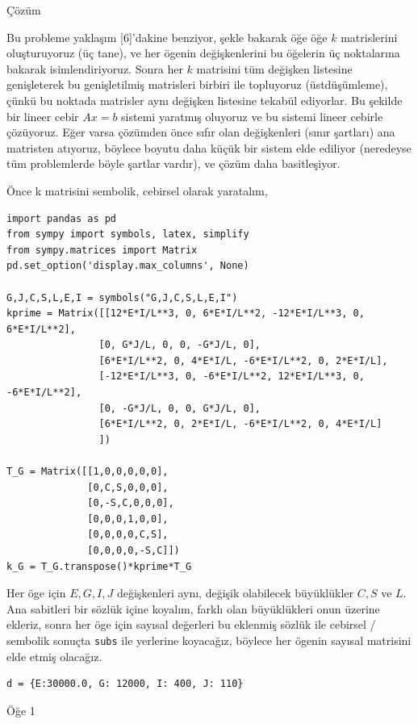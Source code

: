 \documentclass[12pt,fleqn]{article}\usepackage{../../common}
\begin{document}
Çözüm

Bu probleme yaklaşım [6]'dakine benziyor, şekle bakarak öğe öğe $k$ matrislerini
oluşturuyoruz (üç tane), ve her ögenin değişkenlerini bu öğelerin üç noktalarına
bakarak isimlendiriyoruz. Sonra her $k$ matrisini tüm değişken listesine
genişleterek bu genişletilmiş matrisleri birbiri ile topluyoruz (üstdüşümleme),
çünkü bu noktada matrisler aynı değişken listesine tekabül ediyorlar. Bu şekilde
bir lineer cebir $Ax = b$ sistemi yaratmış oluyoruz ve bu sistemi lineer cebirle
çözüyoruz. Eğer varsa çözümden önce sıfır olan değişkenleri (sınır şartları) ana
matristen atıyoruz, böylece boyutu daha küçük bir sistem elde ediliyor
(neredeyse tüm problemlerde böyle şartlar vardır), ve çözüm daha basitleşiyor.

Önce k matrisini sembolik, cebirsel olarak yaratalım,

\begin{verbatim}
import pandas as pd
from sympy import symbols, latex, simplify
from sympy.matrices import Matrix
pd.set_option('display.max_columns', None)

G,J,C,S,L,E,I = symbols("G,J,C,S,L,E,I")
kprime = Matrix([[12*E*I/L**3, 0, 6*E*I/L**2, -12*E*I/L**3, 0, 6*E*I/L**2],
                [0, G*J/L, 0, 0, -G*J/L, 0],
                [6*E*I/L**2, 0, 4*E*I/L, -6*E*I/L**2, 0, 2*E*I/L],
                [-12*E*I/L**3, 0, -6*E*I/L**2, 12*E*I/L**3, 0, -6*E*I/L**2],
                [0, -G*J/L, 0, 0, G*J/L, 0],
                [6*E*I/L**2, 0, 2*E*I/L, -6*E*I/L**2, 0, 4*E*I/L]
                ])

T_G = Matrix([[1,0,0,0,0,0],
              [0,C,S,0,0,0],
              [0,-S,C,0,0,0],
              [0,0,0,1,0,0],
              [0,0,0,0,C,S],
              [0,0,0,0,-S,C]])
k_G = T_G.transpose()*kprime*T_G
\end{verbatim}

Her öge için $E,G,I,J$ değişkenleri aynı, değişik olabilecek büyüklükler $C,S$
ve $L$. Ana sabitleri bir sözlük içine koyalım, farklı olan büyüklükleri onun
üzerine ekleriz, sonra her öge için sayısal değerleri bu eklenmiş sözlük ile
cebirsel / sembolik sonuçta \verb!subs! ile yerlerine koyacağız, böylece her
ögenin sayısal matrisini elde etmiş olacağız.

\begin{verbatim}
d = {E:30000.0, G: 12000, I: 400, J: 110}
\end{verbatim}

Öğe 1
\end{document}
